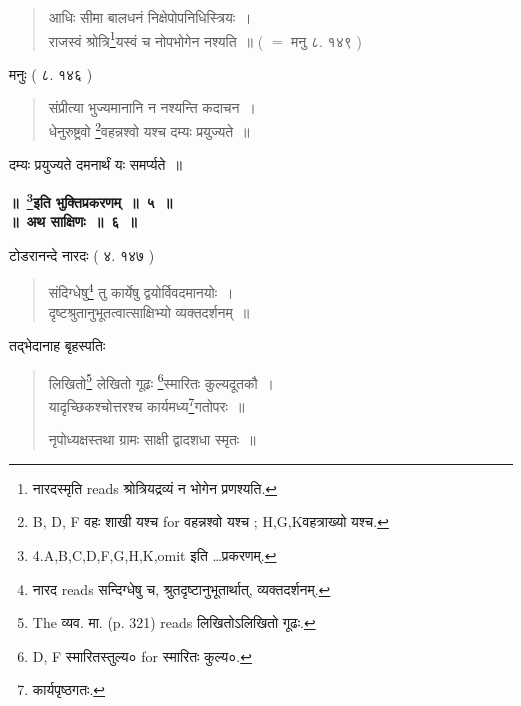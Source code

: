 \documentclass[11pt, openany]{book}
\begin{document}
\begin{quote}
{\vy आधिः सीमा बालधनं निक्षेपोपनिधिस्त्रियः~।\\
राजस्वं श्रोत्रि\renewcommand{\thefootnote}{2}\footnote{नारदस्मृति reads श्रोत्रियद्रव्यं न भोगेन प्रणश्यति.}यस्वं च नोपभोगेन नश्यति~॥} ( $=$ मनु ८. १४९ )
\end{quote}

मनुः ( ८. १४६ ) 

\begin{quote}
{\vy संप्रीत्या भुज्यमानानि न नश्यन्ति कदाचन~।\\
धेनुरुष्ट्रवो \renewcommand{\thefootnote}{3}\footnote{B, D, F वहः शाखी यश्च for वहन्नश्वो यश्च ; H,G,Kवहत्राख्यो यश्च.}वहन्नश्वो यश्च दम्यः प्रयुज्यते~॥}
\end{quote}

दम्यः प्रयुज्यते दमनार्थं यः समर्प्यते~॥

\begin{center}
\textbf{\Large ॥~\renewcommand{\thefootnote}{4}\footnote{4.A,B,C,D,F,G,H,K,omit इति \ldots प्रकरणम्.}इति भुक्तिप्रकरणम्~॥~५~॥}\\

\vspace{2mm}
\textbf{\Large ॥~अथ साक्षिणः~॥~६~॥}
\end{center}

टोडरानन्दे नारदः ( ४. १४७ )

\begin{quote}
{\vy संदिग्धेषु\renewcommand{\thefootnote}{5}\footnote{नारद reads सन्दिग्धेषु च, श्रुतदृष्टानुभूतार्थात्, व्यक्तदर्शनम्.} तु कार्येषु द्वयोर्विवदमानयोः~।\\
दृष्टश्रुतानुभूतत्वात्साक्षिभ्यो व्यक्तदर्शनम्~॥}
\end{quote}

\newpage
{}
\fancyhead[RO]{[$\S$ ६}
\fancyhead[LE]{$\S$ ६]}

तद्भेदानाह बृहस्पतिः 

\begin{quote}
{\vy लिखितो\renewcommand{\thefootnote}{1}\footnote{The व्यव. मा. (p. 321) reads लिखितोऽलिखितो गूढः.} लेखितो गूढः \renewcommand{\thefootnote}{2}\footnote{D, F स्मारितस्तुल्य० for स्मारितः कुल्य०.}स्मारितः कुल्यदूतकौ~।\\
यादृच्छिकश्चोत्तरश्च कार्यमध्य\renewcommand{\thefootnote}{3}\footnote{कार्यपृष्ठगतः.}गतोपरः~॥

नृपोध्यक्षस्तथा ग्रामः साक्षी द्वादशधा स्मृतः~॥}
\end{quote}
\end{document}
